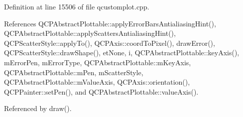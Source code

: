 Definition at line 15506 of file qcustomplot.\+cpp.



References Q\+C\+P\+Abstract\+Plottable\+::apply\+Error\+Bars\+Antialiasing\+Hint(), Q\+C\+P\+Abstract\+Plottable\+::apply\+Scatters\+Antialiasing\+Hint(), Q\+C\+P\+Scatter\+Style\+::apply\+To(), Q\+C\+P\+Axis\+::coord\+To\+Pixel(), draw\+Error(), Q\+C\+P\+Scatter\+Style\+::draw\+Shape(), et\+None, i, Q\+C\+P\+Abstract\+Plottable\+::key\+Axis(), m\+Error\+Pen, m\+Error\+Type, Q\+C\+P\+Abstract\+Plottable\+::m\+Key\+Axis, Q\+C\+P\+Abstract\+Plottable\+::m\+Pen, m\+Scatter\+Style, Q\+C\+P\+Abstract\+Plottable\+::m\+Value\+Axis, Q\+C\+P\+Axis\+::orientation(), Q\+C\+P\+Painter\+::set\+Pen(), and Q\+C\+P\+Abstract\+Plottable\+::value\+Axis().



Referenced by draw().


